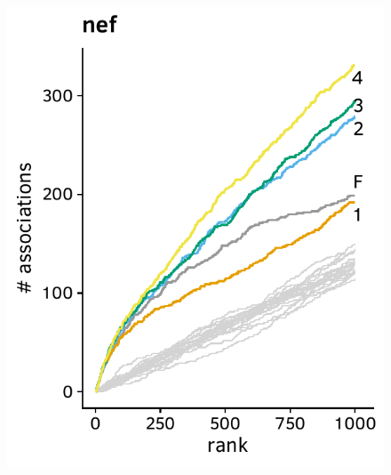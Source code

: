 \documentclass[a4paper,11pt]{article}
\begin{document}
\begin{figure}[H]
\begin{minipage}{.49\textwidth}
      \includegraphics[width=\linewidth]{plots/comparison_plots/hiv_brumme/nef_new_map.pdf}
    \end{minipage}%
  
    \vspace{0.5cm}
  

\end{figure}
\end{document}
